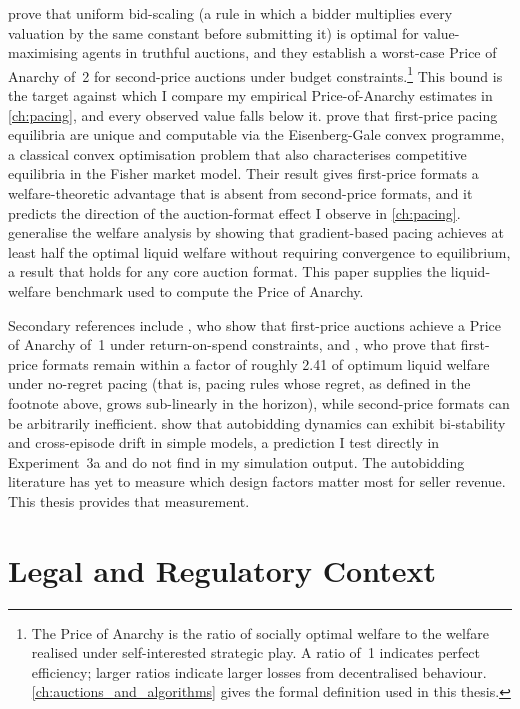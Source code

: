 \citet{Aggarwal2019} prove that uniform bid-scaling (a rule in which a bidder multiplies every valuation by the same constant before submitting it) is optimal for value-maximising agents in truthful auctions, and they establish a worst-case Price of Anarchy of~2 for second-price auctions under budget constraints.\footnote{The Price of Anarchy is the ratio of socially optimal welfare to the welfare realised under self-interested strategic play. A ratio of~1 indicates perfect efficiency; larger ratios indicate larger losses from decentralised behaviour. \cref{ch:auctions_and_algorithms} gives the formal definition used in this thesis.} This bound is the target against which I compare my empirical Price-of-Anarchy estimates in \cref{ch:pacing}, and every observed value falls below it. \citet{Conitzer2022FPPE} prove that first-price pacing equilibria are unique and computable via the Eisenberg-Gale convex programme, a classical convex optimisation problem that also characterises competitive equilibria in the Fisher market model. Their result gives first-price formats a welfare-theoretic advantage that is absent from second-price formats, and it predicts the direction of the auction-format effect I observe in \cref{ch:pacing}. \citet{Gaitonde2023} generalise the welfare analysis by showing that gradient-based pacing achieves at least half the optimal liquid welfare without requiring convergence to equilibrium, a result that holds for any core auction format. This paper supplies the liquid-welfare benchmark used to compute the Price of Anarchy.

Secondary references include \citet{Deng2021TowardsEfficient}, who show that first-price auctions achieve a Price of Anarchy of~1 under return-on-spend constraints, and \citet{FikiorisTardos2023}, who prove that first-price formats remain within a factor of roughly 2.41 of optimum liquid welfare under no-regret pacing (that is, pacing rules whose regret, as defined in the footnote above, grows sub-linearly in the horizon), while second-price formats can be arbitrarily inefficient. \citet{PaesLeme2024} show that autobidding dynamics can exhibit bi-stability and cross-episode drift in simple models, a prediction I test directly in Experiment~3a and do not find in my simulation output. The autobidding literature has yet to measure which design factors matter most for seller revenue. This thesis provides that measurement.

\section{Legal and Regulatory Context}
\label{sec:lit_legal}

